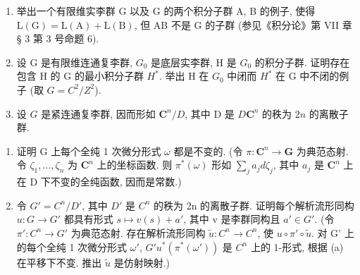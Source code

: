 \begin{enumerate}
\def\labelenumi{\arabic{enumi}.}
\setcounter{enumi}{27}
\item
  举出一个有限维实李群 G 以及 G 的两个积分子群 A, B 的例子, 使得 \(\mathrm{L}(\mathrm{G})=\mathrm{L}(\mathrm{A})+\mathrm{L}(\mathrm{B})\), 但 AB 不是 G 的子群 (参见《积分论》第 VII 章 § 3 第 3 号命题 6).
\item
  设 G 是有限维连通复李群, \(G_{0}\) 是底层实李群, H 是 \(G_{0}\) 的积分子群. 证明存在包含 H 的 G 的最小积分子群 \(H^{*}\). 举出 H 在 \(G_{0}\) 中闭而 \(H^{*}\) 在 G 中不闭的例子 (取 \(G = C^{2}/Z^{2}\)).
\item
  设 \(G\) 是紧连通复李群, 因而形如 \(\mathbf{C}^n / D\), 其中 D 是 \(D\)\(\mathbf{C}^n\) 的秩为 \(2n\) 的离散子群.
\end{enumerate}

\begin{enumerate}
\def\labelenumi{(\alph{enumi})}
\item
  证明 G 上每个全纯 1 次微分形式 \(\omega\) 都是不变的. (令 \(\pi: \mathbf{C}^n \to \mathbf{G}\) 为典范态射. 令 \(\zeta_1, \ldots, \zeta_n\) 为 \(\mathbf{C}^n\) 上的坐标函数. 则 \(\pi^*(\omega)\) 形如 \(\sum_j a_j d\zeta_{j}\), 其中 \(a_j\) 是 \(\mathbf{C}^n\) 上在 D 下不变的全纯函数, 因而是常数.)
\item
  令 \(G' = C^{n}/D'\), 其中 \(D'\) 是 \(C^{n}\) 的秩为 2n 的离散子群. 证明每个解析流形同构 \(u: G \to G'\) 都具有形式 \(s \mapsto v(s) + a'\), 其中 v 是李群同构且 \(a' \in G'\). (令 \(\pi': C^{n} \to G'\) 为典范态射. 存在解析流形同构 \(\tilde{u}: C^{n} \to C^{n}\), 使 \(u \circ \pi' \circ \tilde{u}\). 对 G' 上的每个全纯 1 次微分形式 \(\omega'\), \(G'\)\(u^*(\pi^*(\omega'))\) 是 \(C^{n}\) 上的 1-形式, 根据 (a) 在平移下不变. 推出 \(\tilde{u}\) 是仿射映射.)
\end{enumerate}


